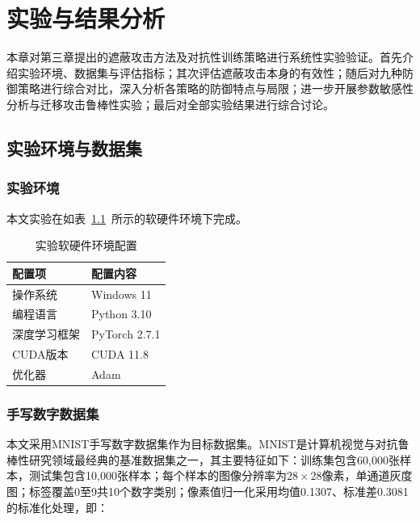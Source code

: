 
\chapter{实验与结果分析} \label{chpt:experiment}

本章对第三章提出的遮蔽攻击方法及对抗性训练策略进行系统性实验验证。首先介绍实验环境、数据集与评估指标；其次评估遮蔽攻击本身的有效性；随后对九种防御策略进行综合对比，深入分析各策略的防御特点与局限；进一步开展参数敏感性分析与迁移攻击鲁棒性实验；最后对全部实验结果进行综合讨论。

\section{实验环境与数据集}

\subsection{实验环境}

本文实验在如表~\ref{tab:env}~所示的软硬件环境下完成。
\begin{table}[htbp]
  \centering
  \caption{实验软硬件环境配置}
  \label{tab:env}
  \begin{tabular}{ll}
    \toprule
    \textbf{配置项} & \textbf{配置内容} \\
    \midrule
    操作系统         & Windows 11 \\
    编程语言         & Python 3.10 \\
    深度学习框架     & PyTorch 2.7.1 \\
    CUDA版本         & CUDA 11.8 \\
    优化器           & Adam \cite{kingma2015adam} \\
    \bottomrule
  \end{tabular}
\end{table}

\subsection{手写数字数据集}

本文采用MNIST手写数字数据集\cite{lecun2010mnist}作为目标数据集。MNIST是计算机视觉与对抗鲁棒性研究领域最经典的基准数据集之一，其主要特征如下：训练集包含60,000张样本，测试集包含10,000张样本；每个样本的图像分辨率为$28 \times 28$像素，单通道灰度图；标签覆盖0至9共10个数字类别；像素值归一化采用均值0.1307、标准差0.3081的标准化处理，即：

